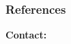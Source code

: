 \documentclass{libs/SUSTech_format}
\begin{document}
\begin{frame}[allowframebreaks]
    \frametitle{References}
    \printbibliography
\end{frame}

\begin{frame}{}
    \centering
    \huge{\textbf{}}
    
    \vspace{1cm}
    
    \Large{\textbf{Contact:}}
    \newline
    \vspace*{0.5cm}
    \large{}
\end{frame}
\end{document}
